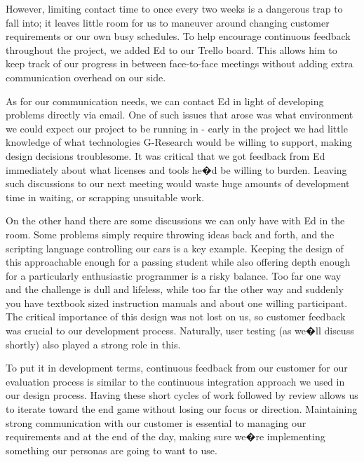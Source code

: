 However, limiting contact time to once every two weeks is a dangerous trap to fall into; it leaves little room for us to maneuver around changing customer requirements or our own busy schedules. To help encourage continuous feedback throughout the project, we added Ed to our Trello board. This allows him to keep track of our progress in between face-to-face meetings without adding extra communication overhead on our side. 

As for our communication needs, we can contact Ed in light of developing problems directly via email. One of such issues that arose was what environment we could expect our project to be running in - early in the project we had little knowledge of what technologies G-Research would be willing to support, making design decisions troublesome. It was critical that we got feedback from Ed immediately about what licenses and tools he�d be willing to burden. Leaving such discussions to our next meeting would waste huge amounts of development time in waiting, or scrapping unsuitable work.

On the other hand there are some discussions we can only have with Ed in the room. Some problems simply require throwing ideas back and forth, and the scripting language controlling our cars is a key example. Keeping the design of this approachable enough for a passing student while also offering depth enough for a particularly enthusiastic programmer is a risky balance. Too far one way and the challenge is dull and lifeless, while too far the other way and suddenly you have textbook sized instruction manuals and about one willing participant. The critical importance of this design was not lost on us, so customer feedback was crucial to our development process. Naturally, user testing (as we�ll discuss shortly) also played a strong role in this.

To put it in development terms, continuous feedback from our customer for our evaluation process is similar to the continuous integration approach we used in our design process. Having these short cycles of work followed by review allows us to iterate toward the end game without losing our focus or direction. Maintaining strong communication with our customer is essential to managing our requirements and at the end of the day, making sure we�re implementing something our personas are going to want to use. 

